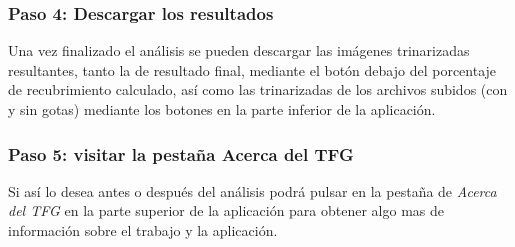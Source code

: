 

\subsubsection{Paso 4:  Descargar los resultados}
Una vez finalizado el análisis se pueden descargar las imágenes trinarizadas resultantes, tanto la de resultado final, mediante el botón debajo del porcentaje de recubrimiento calculado, así como las trinarizadas de los archivos subidos (con y sin gotas) mediante los botones en la parte inferior de la aplicación.

\subsubsection{Paso 5:  visitar la pestaña Acerca del TFG}
Si así lo desea antes o después del análisis podrá pulsar en la pestaña de \textit{Acerca del TFG} en la parte superior de la aplicación para obtener algo mas de información sobre el trabajo y la aplicación.
